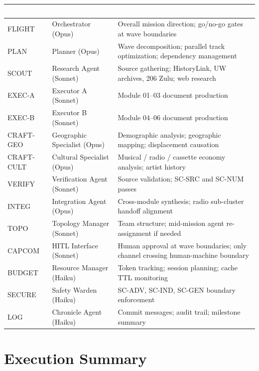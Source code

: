\documentclass[11pt,letterpaper]{article}
\newcommand{\tableheader}[1]{\textbf{\sffamily\textcolor{white}{#1}}}
\begin{document}
\begin{center}
\begin{tabularx}{\textwidth}{L{2cm}L{3.5cm}X}
\toprule
{}
\tableheader{Role} & \tableheader{Agent} & \tableheader{Responsibility} \\
\midrule
FLIGHT & Orchestrator (Opus) & Overall mission direction; go/no-go gates at wave boundaries \\
PLAN & Planner (Opus) & Wave decomposition; parallel track optimization; dependency management \\
SCOUT & Research Agent (Sonnet) & Source gathering; HistoryLink, UW archives, 206 Zulu; web research \\
EXEC-A & Executor A (Sonnet) & Module 01--03 document production \\
EXEC-B & Executor B (Sonnet) & Module 04--06 document production \\
CRAFT-GEO & Geographic Specialist (Opus) & Demographic analysis; geographic mapping; displacement causation \\
CRAFT-CULT & Cultural Specialist (Opus) & Musical / radio / cassette economy analysis; artist history \\
VERIFY & Verification Agent (Sonnet) & Source validation; SC-SRC and SC-NUM passes \\
INTEG & Integration Agent (Opus) & Cross-module synthesis; radio sub-cluster handoff alignment \\
TOPO & Topology Manager (Sonnet) & Team structure; mid-mission agent re-assignment if needed \\
CAPCOM & HITL Interface (Sonnet) & Human approval at wave boundaries; only channel crossing human-machine boundary \\
BUDGET & Resource Manager (Haiku) & Token tracking; session planning; cache TTL monitoring \\
SECURE & Safety Warden (Haiku) & SC-ADV, SC-IND, SC-GEN boundary enforcement \\
LOG & Chronicle Agent (Haiku) & Commit messages; audit trail; milestone summary \\
\bottomrule
\end{tabularx}
\end{center}

\section{Execution Summary}
\end{document}
